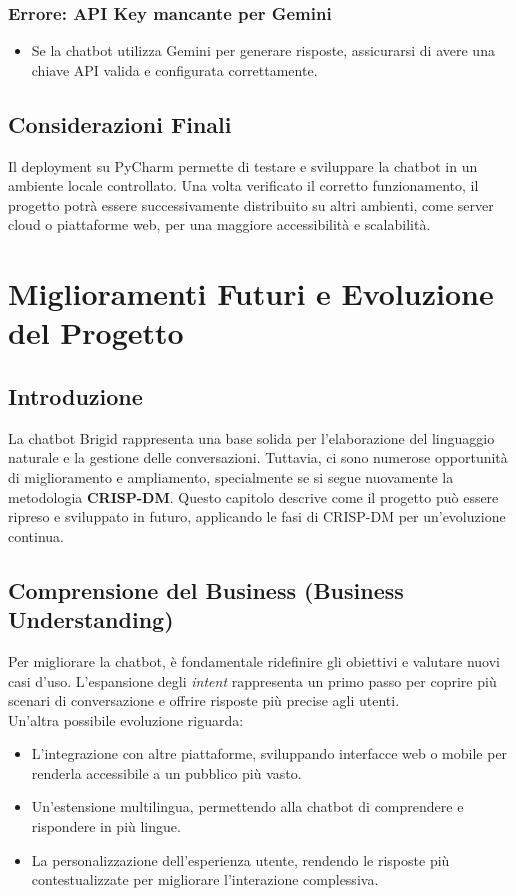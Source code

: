 \documentclass[12pt, letterpaper]{article}
\begin{document}
\subsubsection{Errore: API Key mancante per Gemini}
\begin{itemize}
	\item Se la chatbot utilizza Gemini per generare risposte, assicurarsi di avere una chiave API valida e configurata correttamente.
\end{itemize}

\subsection{Considerazioni Finali}

Il deployment su PyCharm permette di testare e sviluppare la chatbot in un ambiente locale controllato. Una volta verificato il corretto funzionamento, il progetto potrà essere successivamente distribuito su altri ambienti, come server cloud o piattaforme web, per una maggiore accessibilità e scalabilità.
\newpage
\section{Miglioramenti Futuri e Evoluzione del Progetto}

\subsection{Introduzione}
La chatbot Brigid rappresenta una base solida per l'elaborazione del linguaggio naturale e la gestione delle conversazioni. Tuttavia, ci sono numerose opportunità di miglioramento e ampliamento, specialmente se si segue nuovamente la metodologia \textbf{CRISP-DM}. Questo capitolo descrive come il progetto può essere ripreso e sviluppato in futuro, applicando le fasi di CRISP-DM per un'evoluzione continua.

\subsection{Comprensione del Business (Business Understanding)}
Per migliorare la chatbot, è fondamentale ridefinire gli obiettivi e valutare nuovi casi d’uso. L’espansione degli \textit{intent} rappresenta un primo passo per coprire più scenari di conversazione e offrire risposte più precise agli utenti.\\  
Un'altra possibile evoluzione riguarda:
\begin{itemize}
	\item L'integrazione con altre piattaforme, sviluppando interfacce web o mobile per renderla accessibile a un pubblico più vasto.
	\item Un'estensione multilingua, permettendo alla chatbot di comprendere e rispondere in più lingue.
	\item La personalizzazione dell’esperienza utente, rendendo le risposte più contestualizzate per migliorare l'interazione complessiva.
\end{itemize}
\end{document}
